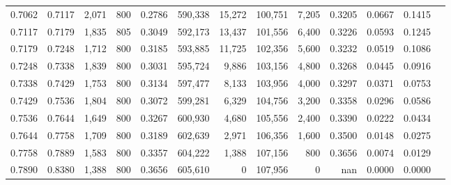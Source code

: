 \begin{tabular}{rrrrrrrrrrrrr}
0.7062 & 0.7117 &  2,071 & 800 &                                     0.2786 & 590,338 &  15,272 & 100,751 &   7,205 & 0.3205 & 0.0667 & 0.1415 \\
0.7117 & 0.7179 &  1,835 & 805 &                                     0.3049 & 592,173 &  13,437 & 101,556 &   6,400 & 0.3226 & 0.0593 & 0.1245 \\
0.7179 & 0.7248 &  1,712 & 800 &                                     0.3185 & 593,885 &  11,725 & 102,356 &   5,600 & 0.3232 & 0.0519 & 0.1086 \\
0.7248 & 0.7338 &  1,839 & 800 &                                     0.3031 & 595,724 &   9,886 & 103,156 &   4,800 & 0.3268 & 0.0445 & 0.0916 \\
0.7338 & 0.7429 &  1,753 & 800 &                                     0.3134 & 597,477 &   8,133 & 103,956 &   4,000 & 0.3297 & 0.0371 & 0.0753 \\
0.7429 & 0.7536 &  1,804 & 800 &                                     0.3072 & 599,281 &   6,329 & 104,756 &   3,200 & 0.3358 & 0.0296 & 0.0586 \\
0.7536 & 0.7644 &  1,649 & 800 &                                     0.3267 & 600,930 &   4,680 & 105,556 &   2,400 & 0.3390 & 0.0222 & 0.0434 \\
0.7644 & 0.7758 &  1,709 & 800 &                                     0.3189 & 602,639 &   2,971 & 106,356 &   1,600 & 0.3500 & 0.0148 & 0.0275 \\
0.7758 & 0.7889 &  1,583 & 800 &                                     0.3357 & 604,222 &   1,388 & 107,156 &     800 & 0.3656 & 0.0074 & 0.0129 \\
0.7890 & 0.8380 &  1,388 & 800 &                                     0.3656 & 605,610 &       0 & 107,956 &       0 &    nan & 0.0000 & 0.0000 \\
\bottomrule
\end{tabular}

